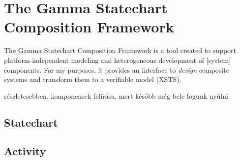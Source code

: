 \section{The Gamma Statechart Composition Framework}\label{sec:gamma}

The Gamma Statechart Composition Framework is a tool created to support platform-independent modeling and heterogeneous development of [system] components. For my purposes, it provides an interface to \emph{design} composite systems and transform them to a verifiable model (XSTS).


részletesebben, komponensek felírása, mert később még bele fogunk nyúlni

\subsection{Statechart}

\subsection{Activity}
